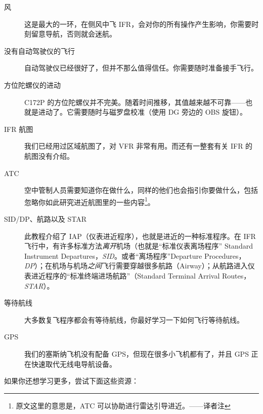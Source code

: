 \begin{description}
\item[风] 这是最大的一环，在侧风中飞 IFR，会对你的所有操作产生影响，你需要时刻留意导航，否则就会迷航。
\item[没有自动驾驶仪的飞行] 自动驾驶仪已经很好了，但并不那么值得信任。你需要随时准备接手飞行。
\item[方位陀螺仪的进动] C172P 的方位陀螺仪并不完美。随着时间推移，其值越来越不可靠——也就是进动了。它需要随时与磁罗盘校准（使用 DG 旁边的 OBS 旋钮）。
\item[IFR 航图] 我们已经用过区域航图了，对 VFR 非常有用。而还有一整套有关 IFR 的航图没有介绍。
\item[ATC] 空中管制人员需要知道你在做什么，同样的他们也会指引你要做什么，包括忽略你如此研究进近航图里的一些内容\footnote{原文这里的意思是，ATC 可以协助进行雷达引导进近。——译者注}。
\item[SID/DP、航路以及 STAR] 此教程介绍了 IAP（仪表进近程序），也就是进近的一种标准程序。在 IFR 飞行中，有许多标准方法\emph{离开}机场（也就是“标准仪表离场程序” Standard Instrument Departures，\emph{SID}。或者“离场程序”Departure Procedures，\emph{DP}）；在机场与机场\emph{之间}飞行需要穿越很多航路（Airway）；从航路进入仪表进近程序的“标准终端进场航路”（Standard Terminal Arrival Routes，\emph{STAR}）。
\item[等待航线] 大多数复飞程序都会有等待航线，你最好学习一下如何飞行等待航线。
\item[GPS] 我们的塞斯纳飞机没有配备 GPS，但现在很多小飞机都有了，并且 GPS 正在快速取代无线电导航设备。
\end{description}

如果你还想学习更多，尝试下面这些资源：

